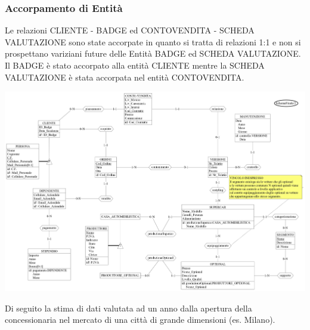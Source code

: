 \documentclass[11pt]{article}
\begin{document}
\subsubsection*{Accorpamento di Entità}

Le relazioni CLIENTE - BADGE ed CONTOVENDITA - SCHEDA VALUTAZIONE sono
state accorpate in quanto si tratta di relazioni 1:1 e non si
prospettano variziani future delle Entità BADGE ed SCHEDA
VALUTAZIONE. Il BADGE è stato accorpato alla entità CLIENTE mentre
la SCHEDA VALUTAZIONE è stata accorpata nel entità CONTOVENDITA.

\begin{center}
    \includegraphics[scale=0.20, angle=90]{images/schemaFinaleRistrutturato.jpeg}
\end{center}

Di seguito la stima di dati valutata ad un anno dalla apertura della
concessionaria nel mercato di una città di grande dimensioni (es. Milano). 
\end{document}
